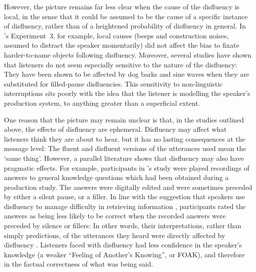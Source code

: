 \documentclass[a4paper,man,natbib]{apa6}
\newcommand*{\citegen}[1]{\citeauthor{#1}'s \citeyear{#1}}
\begin{document}
However, the picture remains far less clear when the cause of the disfluency is local, in the sense that it could be assumed to be the cause of a specific instance of disfluency, rather than of a heightened probability of disfluency in general.
In \citeauthor{Arnold2007}'s Experiment~3, for example, local causes (beeps and construction noises, assumed to distract the speaker momentarily) did not affect the bias to fixate harder-to-name objects following disfluency.
Moreover, several studies have shown that listeners do not seem especially sensitive to the nature of the disfluency:  They have been shown to be affected by dog barks \citep{bailey2003disfluencies} and sine waves \citep{corley2011helps} when they are substituted for filled-pause disfluencies.
This sensitivity to non-linguistic interruptions sits poorly with the idea that the listener is modelling the speaker's production system, to anything greater than a superficial extent.

One reason that the picture may remain unclear is that, in the studies outlined above, the effects of disfluency are ephemeral.
Disfluency may affect what listeners think they are about to hear, but it has no lasting consequences at the message level:  The fluent and disfluent versions of the utterances used mean the `same thing'.
However, a parallel literature shows that disfluency may also have pragmatic effects.
%
For example, participants in \citegen{Brennan1995} study were played recordings of answers to general knowledge questions which had been obtained during a production study.
The answers were digitally edited and were sometimes preceded by either a silent pause, or a filler.
In line with the suggestion that speakers use disfluency to manage difficulty in retrieving information \citep{Smith1993}, participants rated the answers as being less likely to be correct when the recorded answers were preceded by silence or fillers:
In other words, their interpretations, rather than simply predictions, of the utterances they heard were directly affected by disfluency \citep[see also][]{Swerts2005}.
Listeners faced with disfluency had less confidence in the speaker's knowledge (a weaker ``Feeling of Another's Knowing'', or FOAK), and therefore in the factual correctness of what was being said.

\end{document}
